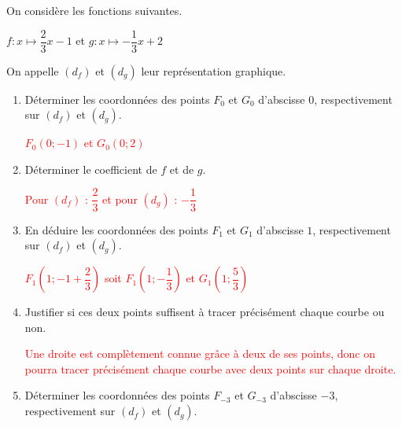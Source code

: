 \begin{corrige}
    On considère les fonctions suivantes.

    $f:x\longmapsto \dfrac23 x -1$ et $g:x\longmapsto -\dfrac13 x +2$

    On appelle $(d_f)$ et $(d_g)$ leur représentation graphique.

    \scalebox{1}{%
        \Fonction[%
            Trace,%
            Calcul={2x/3-1,-x/3+2},%
            CouleurTrace={red,red,red},%
            Bornea={-4,-4},%
            Borneb={4 ,4 },%
            Xmin=-3.666,Xmax=3.666,Xstep=1,%
            Ymin=-3,Ymax=3,Ystep=1,%
            Origine={(3.666,3)},%
            PasGrilleX=0.333,%
            PasGrilleY=0.333,%
            Grille,%
            Traces={%
                dotlabel.bot(btex \num{1} etex,placepoint(1,0));
                dotlabel.lft(btex \num{1} etex,placepoint(0,1));      
                drawoptions(withcolor red);
                dotlabel.urt(btex $G_0$ etex,placepoint(0,2));
                dotlabel.lrt(btex $F_0$ etex,placepoint(0,-1));
                dotlabel.urt(btex $G_1$ etex,placepoint(1,1+2/3));
                dotlabel.lrt(btex $F_1$ etex,placepoint(1,-1/3));
                dotlabel.llft(btex $G_{-3}$ etex,placepoint(-3,3));
                dotlabel.ulft(btex $F_{-3}$ etex,placepoint(-3,-3));
                dotlabel.top(btex $I$ etex,placepoint(3,1));
            }
        ]{}
    }
    \begin{enumerate}
        \item Déterminer les coordonnées des points $F_0$ et $G_0$ d'abscisse $0$, respectivement sur $(d_f)$ et $(d_g)$.
        
        \textcolor{red}{$F_0(0;-1)$ et $G_0(0;2)$}
        \item Déterminer le coefficient de $f$ et de $g$.
        
        \textcolor{red}{Pour $(d_f)$ : $\dfrac23$ et pour $(d_g)$ : $-\dfrac13$}
        \item En déduire les coordonnées des points $F_1$ et $G_1$ d'abscisse $1$, respectivement sur $(d_f)$ et $(d_g)$.
        
        \textcolor{red}{$F_1(1;-1+\dfrac23)$ soit $F_1(1;-\dfrac13)$ et $G_1(1;\dfrac53)$}
        \item Justifier si ces deux points suffisent à tracer précisément chaque courbe ou non.
        
        \textcolor{red}{Une droite est complètement connue grâce à deux de ses points, donc on pourra tracer précisément chaque courbe avec deux points sur chaque droite.}
        \item Déterminer les coordonnées des points $F_{-3}$ et $G_{-3}$ d'abscisse $-3$, respectivement sur $(d_f)$ et $(d_g)$.
        

\end{enumerate}
\end{corrige}
